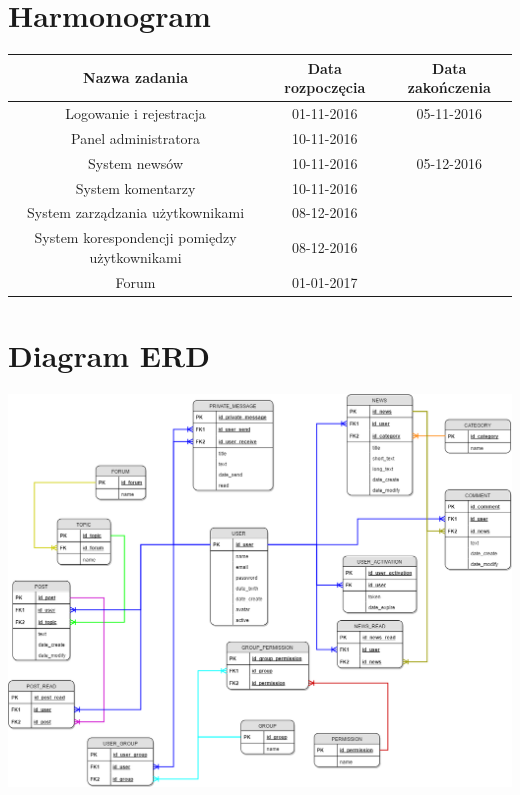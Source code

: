 \documentclass[12pt,oneside]{article}
\begin{document}
\section{Harmonogram}
\begin{tabular}{|c|c|c|}
	\hline \textbf{Nazwa zadania} & \textbf{Data rozpoczęcia} & \textbf{Data zakończenia} \\ 
	\hline Logowanie i rejestracja & 01-11-2016 & 05-11-2016 \\ 
	\hline Panel administratora & 10-11-2016 &  \\ 
	\hline System newsów & 10-11-2016 & 05-12-2016 \\ 
	\hline System komentarzy & 10-11-2016 &  \\
	\hline System zarządzania użytkownikami & 08-12-2016 &  \\ 
	\hline System korespondencji pomiędzy użytkownikami & 08-12-2016 &  \\ 
	\hline Forum & 01-01-2017 &  \\ 
	\hline 
\end{tabular} 
\section{Diagram ERD}
	\includegraphics[width=1\textwidth]{erd3.png}
\end{document}
